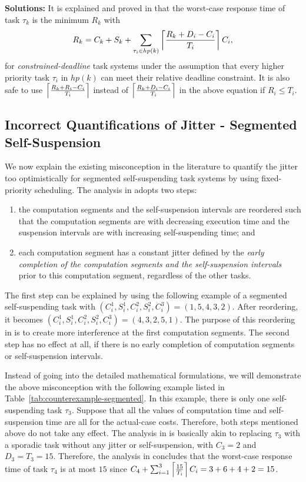{\bf Solutions:} It is explained and proved in \cite{huangpass:dac2015,BletsasReport2015} that the worst-case response time of task $\tau_k$ is the minimum $R_k$ with
\begin{equation}
R_k = C_k+ S_k+\sum_{\tau_i \in hp(k)}\left\lceil{\frac{R_k+D_i-C_i}{T_i}}\right\rceil C_i,
\label{eq:dynamic-correct}
\end{equation}
for \emph{constrained-deadline} task systems under the assumption that every higher priority task $\tau_i$ in $hp(k)$ can meet their relative deadline constraint. It is also safe to use $\left\lceil{\frac{R_k+R_i-C_i}{T_i}}\right\rceil$ instead of $\left\lceil{\frac{R_k+D_i-C_i}{T_i}}\right\rceil$ in the above equation if $R_i \leq T_i$.

\subsection{Incorrect Quantifications of Jitter - Segmented Self-Suspension}
\label{sec:wrong-jitter-segmented}


We now explain the existing misconception in the literature to quantify the jitter too optimistically for segmented self-suspending task systems by using fixed-priority scheduling.  The analysis in \cite{RTCSA-BletsasA05} adopts two steps: 
\begin{enumerate}
\item the computation segments and the self-suspension intervals are reordered such that the computation segments are with decreasing execution time and the suspension intervals are with increasing self-suspending time; and 
\item each computation segment has a constant jitter defined by the \emph{early completion of the computation segments and the self-suspension intervals} prior to this computation segment, regardless of the other tasks. 
\end{enumerate}
The first step can be explained by using the following example of a segmented self-suspending task with $(C_i^1, S_i^1, C_i^2, S_i^2, C_i^3) = (1, 5, 4, 3, 2)$. After reordering, it becomes $(C_i^1, S_i^1, C_i^2, S_i^2, C_i^3)  = (4, 3, 2, 5, 1)$. The purpose of this reordering in \cite{RTCSA-BletsasA05} is to create more interference at the first computation segments. 
The second step has no effect at all, if there is no early completion of computation segments or self-suspension intervals.

Instead of going into the detailed mathematical formulations, we will demonstrate the above misconception with the following example listed in Table~\ref{tab:counterexample-segmented}.
In this example, there is only one self-suspending task $\tau_3$. Suppose that all the values of computation time and self-suspension time are all for the actual-case costs. Therefore, both steps mentioned above do not take any effect. The analysis in \cite{RTCSA-BletsasA05} is basically akin to replacing $\tau_3$ with a sporadic task without any jitter or self-suspension, with $C_3=2$ and $D_3=T_3=15$. Therefore, the analysis in \cite{RTCSA-BletsasA05}  concludes that the worst-case response time of task $\tau_4$ is at most $15$ since $C_4+\sum_{i=1}^{3}\left\lceil{\frac{15}{T_i}}\right\rceil C_i = 3+ 6 + 4 + 2= 15$.


